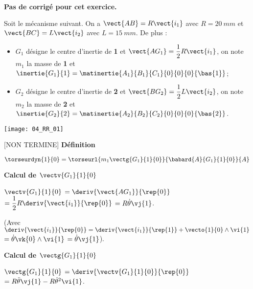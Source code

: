 \normaltrue
\correctionfalse


\setcounter{numques}{0}
\ifcorrection
\else
\textbf{Pas de corrigé pour cet exercice.}
\fi

\ifprof
\else
Soit le mécanisme suivant. On a $\vect{AB}=R\vect{i_1}$ avec $R=\SI{20}{mm}$ et  
$\vect{BC}=L\vect{i_2}$ avec $L=\SI{15}{mm}$. De plus :
\begin{itemize}
\item $G_1$ désigne le centre d'inertie de \textbf{1} et $\vect{AG_1}=\dfrac{1}{2}R\vect{i_1}$, on note $m_1$ la masse de \textbf{1} et $\inertie{G_1}{1}=\matinertie{A_1}{B_1}{C_1}{0}{0}{0}{\bas{1}}$; 
\item $G_2$ désigne le centre d'inertie de \textbf{2} et $\vect{BG_2}=\dfrac{1}{2}L\vect{i_2}$, on note $m_2$ la masse de \textbf{2} et $\inertie{G_2}{2}=\matinertie{A_2}{B_2}{C_2}{0}{0}{0}{\bas{2}}$.
\end{itemize}
\begin{center}
\texttt{[image: 04\_RR\_01]}
\end{center}
\fi

\ifprof

[NON TERMINE]
\textbf{Définition}

$\torseurdyn{1}{0} = \torseurl{m_1 \vectg{G_1}{1}{0}}{\babard{A}{G_1}{1}{0}}{A}$

\textbf{Calcul de $\vectv{G_1}{1}{0}$}

$\vectv{G_1}{1}{0}$ $ = \deriv{\vect{AG_1}}{\rep{0}}$
$ = \dfrac{1}{2}R\deriv{\vect{i_1}}{\rep{0}}$
$ = R\dot{\theta}\vj{1}$.

(Avec $\deriv{\vect{i_1}}{\rep{0}} = \deriv{\vect{i_1}}{\rep{1}} + \vecto{1}{0}\wedge \vi{1}$
$ = \dot{\theta}\vk{0}\wedge \vi{1}$ $ = \dot{\theta}\vj{1}$).

\textbf{Calcul de $\vectg{G_1}{1}{0}$}

$\vectg{G_1}{1}{0}$ $ = \deriv{{\vectv{G_1}{1}{0}}}{\rep{0}}$
$ =  R\ddot{\theta}\vj{1} - R\dot{\theta}^2\vi{1} $.


\else
\fi

\ifprof

